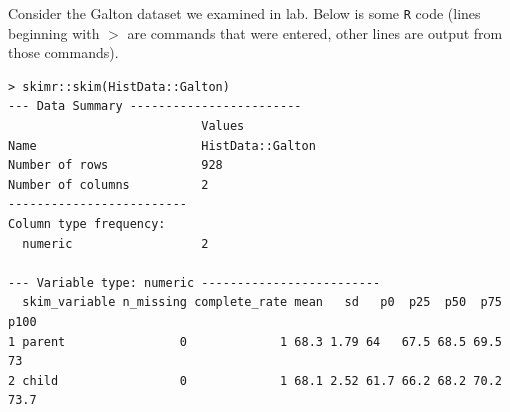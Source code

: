 \documentclass[12pt]{article}
\begin{document}
\problem Consider the Galton dataset we examined in lab. Below is some \texttt{R} code (lines beginning with $>$ are commands that were entered, other lines are output from those commands).

\begin{lstlisting}
> skimr::skim(HistData::Galton)
--- Data Summary ------------------------
                           Values          
Name                       HistData::Galton
Number of rows             928             
Number of columns          2               
-------------------------                  
Column type frequency:                     
  numeric                  2                

--- Variable type: numeric ------------------------- 
  skim_variable n_missing complete_rate mean   sd   p0  p25  p50  p75 p100 
1 parent                0             1 68.3 1.79 64   67.5 68.5 69.5 73   
2 child                 0             1 68.1 2.52 61.7 66.2 68.2 70.2 73.7 
\end{lstlisting}

\vspace{-0.7cm}
\end{document}
